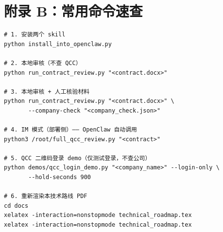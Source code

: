 \documentclass[11pt,a4paper]{article}
\begin{document}
\section*{附录 B：常用命令速查}

\begin{lstlisting}[style=shell]
# 1. 安装两个 skill
python install_into_openclaw.py

# 2. 本地审核（不查 QCC）
python run_contract_review.py "<contract.docx>"

# 3. 本地审核 + 人工核验材料
python run_contract_review.py "<contract.docx>" \
       --company-check "<company_check.json>"

# 4. IM 模式（部署侧）—— OpenClaw 自动调用
python3 /root/full_qcc_review.py "<contract>"

# 5. QCC 二维码登录 demo（仅测试登录，不查公司）
python demos/qcc_login_demo.py "<company_name>" --login-only \
       --hold-seconds 900

# 6. 重新渲染本技术路线 PDF
cd docs
xelatex -interaction=nonstopmode technical_roadmap.tex
xelatex -interaction=nonstopmode technical_roadmap.tex
\end{lstlisting}
\end{document}
